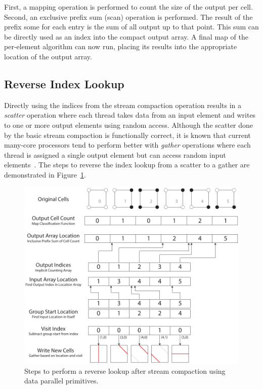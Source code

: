 \documentclass{superfri}
\newcommand*{\lcite}[1]{~\cite{#1}}
\newcommand*{\keyterm}[1]{\emph{#1}}
\begin{document}
First, a mapping operation is performed to count the size of the output per
cell. Second, an exclusive prefix sum (scan) operation is performed. The
result of the prefix some for each entry is the sum of all output up to
that point. This sum can be directly used as an index into the compact
output array. A final map of the per-element algorithm can now run, placing
its results into the appropriate location of the output array.

\subsection{Reverse Index Lookup}

\noindent
Directly using the indices from the stream compaction operation results in
a \keyterm{scatter} operation where each thread takes data from an input
element and writes to one or more output elements using random access.
Although the scatter done by the basic stream compaction is functionally
correct, it is known that current many-core processors tend to perform
better with \keyterm{gather} operations where each thread is assigned a
single output element but can access random input
elements\lcite{Stratton2012}. The steps to reverse the index lookup from a
scatter to a gather are demonstrated in Figure~\ref{fig:ReverseLookup}.

\begin{figure}[htb]
  \centering
  \includegraphics{images/ReverseLookup}
  \caption{Steps to perform a reverse lookup after stream compaction using
    data parallel primitives.}
  \label{fig:ReverseLookup}
\end{figure}
\end{document}
